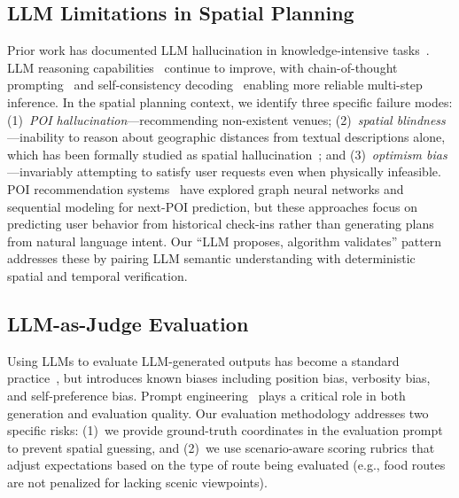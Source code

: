 \subsection{LLM Limitations in Spatial Planning}

Prior work has documented LLM hallucination in knowledge-intensive tasks~\cite{ji2023survey}. LLM reasoning capabilities~\cite{liu2025logical} continue to improve, with chain-of-thought prompting~\cite{wei2022chain} and self-consistency decoding~\cite{wang2023selfconsistency} enabling more reliable multi-step inference. In the spatial planning context, we identify three specific failure modes: (1)~\textit{POI hallucination}---recommending non-existent venues; (2)~\textit{spatial blindness}---inability to reason about geographic distances from textual descriptions alone, which has been formally studied as spatial hallucination~\cite{zhang2025spatial}; and (3)~\textit{optimism bias}---invariably attempting to satisfy user requests even when physically infeasible. POI recommendation systems~\cite{zhao2024poi} have explored graph neural networks and sequential modeling for next-POI prediction, but these approaches focus on predicting user behavior from historical check-ins rather than generating plans from natural language intent. Our ``LLM proposes, algorithm validates'' pattern addresses these by pairing LLM semantic understanding with deterministic spatial and temporal verification.

\subsection{LLM-as-Judge Evaluation}

Using LLMs to evaluate LLM-generated outputs has become a standard practice~\cite{gu2024llmjudge}, but introduces known biases including position bias, verbosity bias, and self-preference bias. Prompt engineering~\cite{schulhoff2024prompt,white2023prompt} plays a critical role in both generation and evaluation quality. Our evaluation methodology addresses two specific risks: (1)~we provide ground-truth coordinates in the evaluation prompt to prevent spatial guessing, and (2)~we use scenario-aware scoring rubrics that adjust expectations based on the type of route being evaluated (e.g., food routes are not penalized for lacking scenic viewpoints).

